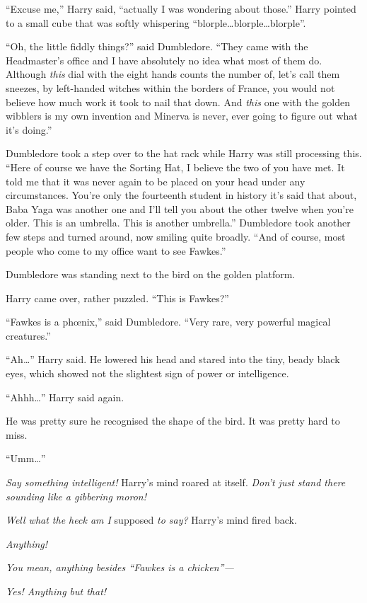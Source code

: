 “Excuse me,” Harry said, “actually I was wondering about those.” Harry pointed to a small cube that was softly whispering “blorple…blorple…blorple”.

“Oh, the little fiddly things?” said Dumbledore. “They came with the Headmaster’s office and I have absolutely no idea what most of them do. Although \emph{this} dial with the eight hands counts the number of, let’s call them sneezes, by left-handed witches within the borders of France, you would not believe how much work it took to nail that down. And \emph{this} one with the golden wibblers is my own invention and Minerva is never, ever going to figure out what it’s doing.”

Dumbledore took a step over to the hat rack while Harry was still processing this. “Here of course we have the Sorting Hat, I believe the two of you have met. It told me that it was never again to be placed on your head under any circumstances. You’re only the fourteenth student in history it’s said that about, Baba Yaga was another one and I’ll tell you about the other twelve when you’re older. This is an umbrella. This is another umbrella.” Dumbledore took another few steps and turned around, now smiling quite broadly. “And of course, most people who come to my office want to see Fawkes.”

Dumbledore was standing next to the bird on the golden platform.

Harry came over, rather puzzled. “This is Fawkes?”

“Fawkes is a phœnix,” said Dumbledore. “Very rare, very powerful magical creatures.”

“Ah…” Harry said. He lowered his head and stared into the tiny, beady black eyes, which showed not the slightest sign of power or intelligence.

“Ahhh…” Harry said again.

He was pretty sure he recognised the shape of the bird. It was pretty hard to miss.

“Umm…”

\emph{Say something intelligent!} Harry’s mind roared at itself. \emph{Don’t just stand there sounding like a gibbering moron!}

\emph{Well what the heck am I} supposed \emph{to say?} Harry’s mind fired back.

\emph{Anything!}

\emph{You mean, anything besides “Fawkes is a chicken”—}

\emph{Yes! Anything but that!}

